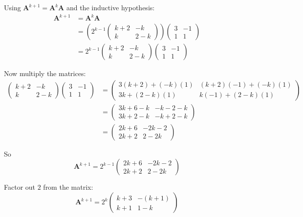 \documentclass[leqno]{article}
\begin{document}
\begin{enumerate}[
  label=\textbf{\arabic*.},
  leftmargin=*,
  topsep=0pt,
  partopsep=0pt,
  parsep=0pt
]
\begin{djsSolution}
Using \(\mathbf{A}^{k+1}=\mathbf{A}^k\mathbf{A}\) and the inductive hypothesis:
\begin{align*}
\mathbf{A}^{k+1}
&=\mathbf{A}^k\mathbf{A}\\
&=\left(2^{k-1}\begin{pmatrix}
k+2 & -k\\
k & 2-k
\end{pmatrix}\right)
\begin{pmatrix}
3 & -1\\
1 & 1
\end{pmatrix}\\
&=2^{k-1}
\begin{pmatrix}
k+2 & -k\\
k & 2-k
\end{pmatrix}
\begin{pmatrix}
3 & -1\\
1 & 1
\end{pmatrix}
\end{align*}

Now multiply the matrices:
\begin{align*}
\begin{pmatrix}
k+2 & -k\\
k & 2-k
\end{pmatrix}
\begin{pmatrix}
3 & -1\\
1 & 1
\end{pmatrix}
&=
\begin{pmatrix}
3(k+2)+(-k)(1) & (k+2)(-1)+(-k)(1)\\
3k+(2-k)(1) & k(-1)+(2-k)(1)
\end{pmatrix}\\
&=
\begin{pmatrix}
3k+6-k & -k-2-k\\
3k+2-k & -k+2-k
\end{pmatrix}\\
&=
\begin{pmatrix}
2k+6 & -2k-2\\
2k+2 & 2-2k
\end{pmatrix}
\end{align*}

So
\[
\mathbf{A}^{k+1}
=
2^{k-1}
\begin{pmatrix}
2k+6 & -2k-2\\
2k+2 & 2-2k
\end{pmatrix}
\]

Factor out \(2\) from the matrix:
\[
\mathbf{A}^{k+1}
=
2^{k}
\begin{pmatrix}
k+3 & -(k+1)\\
k+1 & 1-k
\end{pmatrix}
\]


\end{djsSolution}
\end{enumerate}
\end{document}
